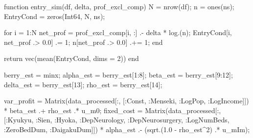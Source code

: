 \documentclass[
  letterpaper,
  DIV=11,
  numbers=noendperiod]{scrreprt}
\newenvironment{Shaded}{\begin{snugshade}}{\end{snugshade}}
\newcommand{\ControlFlowTok}[1]{\textcolor[rgb]{0.00,0.23,0.31}{#1}}
\newcommand{\DataTypeTok}[1]{\textcolor[rgb]{0.68,0.00,0.00}{#1}}
\newcommand{\FloatTok}[1]{\textcolor[rgb]{0.68,0.00,0.00}{#1}}
\newcommand{\FunctionTok}[1]{\textcolor[rgb]{0.28,0.35,0.67}{#1}}
\newcommand{\KeywordTok}[1]{\textcolor[rgb]{0.00,0.23,0.31}{#1}}
\newcommand{\NormalTok}[1]{\textcolor[rgb]{0.00,0.23,0.31}{#1}}
\newcommand{\OperatorTok}[1]{\textcolor[rgb]{0.37,0.37,0.37}{#1}}
\begin{document}
\begin{Shaded}
\begin{Highlighting}[]
\KeywordTok{function} \FunctionTok{entry\_sim}\NormalTok{(df, delta, prof\_excl\_comp)}
\NormalTok{    N }\OperatorTok{=} \FunctionTok{nrow}\NormalTok{(df);}
\NormalTok{    n }\OperatorTok{=} \FunctionTok{ones}\NormalTok{(ns);}
\NormalTok{    EntryCond }\OperatorTok{=} \FunctionTok{zeros}\NormalTok{(}\DataTypeTok{Int64}\NormalTok{, N, ns);}
    
    \ControlFlowTok{for}\NormalTok{ i }\OperatorTok{=} \FloatTok{1}\OperatorTok{:}\NormalTok{N}
\NormalTok{        net\_prof }\OperatorTok{=}\NormalTok{ prof\_excl\_comp[i, }\OperatorTok{:}\NormalTok{] }\OperatorTok{.{-}}\NormalTok{ delta }\OperatorTok{*} \FunctionTok{log}\NormalTok{.(n);}
\NormalTok{        EntryCond[i, net\_prof }\OperatorTok{.\textgreater{}} \FloatTok{0.0}\NormalTok{] }\OperatorTok{.=} \FloatTok{1}\NormalTok{;}
\NormalTok{        n[net\_prof }\OperatorTok{.\textgreater{}} \FloatTok{0.0}\NormalTok{] }\OperatorTok{.+=} \FloatTok{1}\NormalTok{;}
    \ControlFlowTok{end}

    \ControlFlowTok{return} \FunctionTok{vec}\NormalTok{(}\FunctionTok{mean}\NormalTok{(EntryCond, dims }\OperatorTok{=} \FloatTok{2}\NormalTok{))}
\KeywordTok{end}

\NormalTok{berry\_est }\OperatorTok{=}\NormalTok{ minx;}
\NormalTok{alpha\_est }\OperatorTok{=}\NormalTok{ berry\_est[}\FloatTok{1}\OperatorTok{:}\FloatTok{8}\NormalTok{];}
\NormalTok{beta\_est }\OperatorTok{=}\NormalTok{ berry\_est[}\FloatTok{9}\OperatorTok{:}\FloatTok{12}\NormalTok{];}
\NormalTok{delta\_est }\OperatorTok{=}\NormalTok{ berry\_est[}\FloatTok{13}\NormalTok{];}
\NormalTok{rho\_est }\OperatorTok{=}\NormalTok{ berry\_est[}\FloatTok{14}\NormalTok{];}

\NormalTok{var\_profit }\OperatorTok{=} \FunctionTok{Matrix}\NormalTok{(data\_processed[}\OperatorTok{:}\NormalTok{, [}\OperatorTok{:}\NormalTok{Const, }\OperatorTok{:}\NormalTok{Menseki, }\OperatorTok{:}\NormalTok{LogPop, }\OperatorTok{:}\NormalTok{LogIncome]]) }\OperatorTok{*}\NormalTok{ beta\_est }\OperatorTok{.+} 
\NormalTok{    rho\_est }\OperatorTok{.*}\NormalTok{ u\_m0;}
\NormalTok{fixed\_cost }\OperatorTok{=} \FunctionTok{Matrix}\NormalTok{(data\_processed[}\OperatorTok{:}\NormalTok{, [}\OperatorTok{:}\NormalTok{Kyukyu, }\OperatorTok{:}\NormalTok{Sien, }\OperatorTok{:}\NormalTok{Hyoka, }\OperatorTok{:}\NormalTok{DepNeurology, }\OperatorTok{:}\NormalTok{DepNeurosurgery, }\OperatorTok{:}\NormalTok{LogNumBeds, }\OperatorTok{:}\NormalTok{ZeroBedDum, }\OperatorTok{:}\NormalTok{DaigakuDum]]) }\OperatorTok{*}\NormalTok{ alpha\_est }\OperatorTok{.{-}}
\NormalTok{    (}\FunctionTok{sqrt}\NormalTok{.(}\FloatTok{1.0} \OperatorTok{{-}}\NormalTok{ rho\_est}\OperatorTok{\^{}}\FloatTok{2}\NormalTok{) }\OperatorTok{.*}\NormalTok{ u\_mIm);}


\end{Highlighting}
\end{Shaded}
\end{document}
